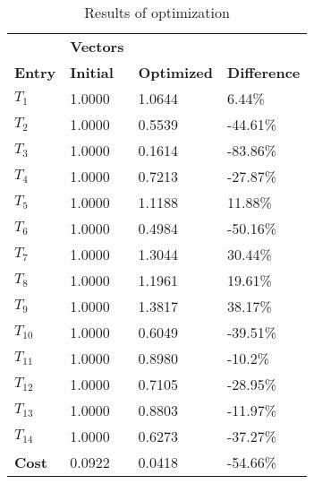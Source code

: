 \begin{table}[H]
\centering
\begin{tabular}{llll}
\textbf{}      & \cellcolor[HTML]{EFEFEF}\textbf{Vectors} & \textbf{} & \textbf{}         \\
\rowcolor[HTML]{EFEFEF} 
\textbf{Entry} & \textbf{Initial} & \textbf{Optimized} & \textbf{Difference} \\
$T_1$ & 1.0000 & 1.0644 & 6.44\% \\ 
$T_2$ & 1.0000 & 0.5539 & -44.61\% \\ 
$T_3$ & 1.0000 & 0.1614 & -83.86\% \\ 
$T_4$ & 1.0000 & 0.7213 & -27.87\% \\ 
$T_5$ & 1.0000 & 1.1188 & 11.88\% \\ 
$T_6$ & 1.0000 & 0.4984 & -50.16\% \\ 
$T_7$ & 1.0000 & 1.3044 & 30.44\% \\ 
$T_8$ & 1.0000 & 1.1961 & 19.61\% \\ 
$T_9$ & 1.0000 & 1.3817 & 38.17\% \\ 
$T_10$ & 1.0000 & 0.6049 & -39.51\% \\ 
$T_11$ & 1.0000 & 0.8980 & -10.2\% \\ 
$T_12$ & 1.0000 & 0.7105 & -28.95\% \\ 
$T_13$ & 1.0000 & 0.8803 & -11.97\% \\ 
$T_14$ & 1.0000 & 0.6273 & -37.27\% \\ 
\rowcolor[HTML]{EFEFEF} 
\textbf{Cost}  & 0.0922 & 0.0418 & -54.66\% \\ 
\end{tabular}
\caption{Results of optimization}
\label{tab:OptimizationAnalysis}
\end{table}